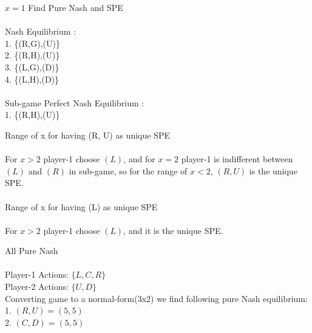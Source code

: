 \documentclass[
  course = {{IE579 Game Theory and Multi-Agent Reinforcement Learning}},
  quartile = {{4}},
  assignment = 2,
  name = {{Mohammad Mahdi Rahimi}},
  studentnumber = {{20208244}},
  email = {{mahi@kaist.ac.kr}},
  firstexercise = 1
]{aga-homework}
\begin{document}
\exercise
\subexercise $x = 1$ Find Pure Nash and SPE
\\\\
Nash Equilibrium :\\
1. \{(R,G),(U)\}\\
2. \{(R,H),(U)\}\\
3. \{(L,G),(D)\}\\
4. \{(L,H),(D)\}\\
\\
Sub-game Perfect Nash Equilibrium :\\
1. \{(R,H),(U)\}


\subexercise Range of x for having (R, U) as unique SPE
\\\\
For $x > 2$ player-1 choose $(L)$, and for $x = 2$ player-1 is indifferent between $(L)$ and $(R)$ in sub-game, so for the range of $x < 2$, $(R, U)$ is the unique SPE.
\\\\
\subexercise  Range of x for having (L) as unique SPE
\\\\
For $x > 2$ player-1 choose $(L)$, and it is the unique SPE.

\exercise
\subexercise All Pure Nash
\\\\
Player-1 Actions: $\{L, C, R\}$\\
Player-2 Actions: $\{U, D\}$\\
Converting game to a normal-form(3x2) we find following pure Nash equilibrium:\\
1. $(R, U) = (5, 5)$\\
2. $(C, D) = (5, 5)$
\end{document}
